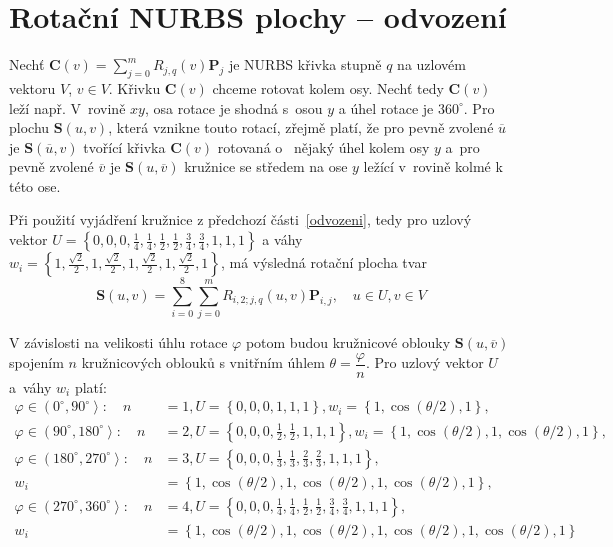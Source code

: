 \section{Rotační NURBS plochy -- odvození}\label{revSurf}

Nechť $\mathbf{C}\left(v\right)=\sum_{j=0}^{m}R_{j,q}\left(v\right)\mathbf{P}_j$ je NURBS křivka stupně $q$ na uzlovém vektoru $V$, $v\in V$. Křivku $\mathbf{C}\left(v\right)$ chceme rotovat kolem osy. Nechť tedy $\mathbf{C}\left(v\right)$ leží např. V~rovině $xy$, osa rotace je shodná s~osou $y$ a úhel rotace je $360^\circ$. Pro plochu $\mathbf{S}\left(u,v\right)$, která vznikne touto rotací, zřejmě platí, že pro pevně zvolené $\overline{u}$ je $\mathbf{S}\left(\overline{u},v\right)$ tvořící křivka $\mathbf{C}\left(v\right)$ rotovaná o~ nějaký úhel kolem osy $y$ a~pro pevně zvolené $\overline{v}$ je $\mathbf{S}\left(u,\overline{v}\right)$ kružnice se středem na ose $y$ ležící v~rovině kolmé k této ose.

Při použití vyjádření kružnice z předchozí části~\ref{odvozeni}, tedy pro uzlový vektor \linebreak$U=\left\lbrace 0,0,0,\frac{1}{4},\frac{1}{4},\frac{1}{2},\frac{1}{2},\frac{3}{4},\frac{3}{4},1,1,1 \right\rbrace$ a váhy $w_i=\left\lbrace 1,\frac{\sqrt{2}}{2},1,\frac{\sqrt{2}}{2},1,\frac{\sqrt{2}}{2},1,\frac{\sqrt{2}}{2},1\right\rbrace$, má výsledná rotační plocha tvar
\begin{equation}
\mathbf{S}\left(u,v\right)=\sum_{i=0}^{8}\sum_{j=0}^{m}R_{i,2;j,q}\left(u,v\right)\mathbf{P}_{i,j},\quad u\in U, v\in V
\end{equation}

V závislosti na velikosti úhlu rotace $\varphi$ potom budou kružnicové oblouky $\mathbf{S}\left(u,\overline{v}\right)$ spojením $n$ kružnicových oblouků s vnitřním úhlem $\theta=\dfrac{\varphi}{n}$. Pro uzlový vektor $U$ a~váhy $w_i$ platí:
\begin{align*}
	\varphi\in\left(0^\circ,90^\circ\right\rangle:\quad n&=1, U=\left\lbrace 0,0,0,1,1,1 \right\rbrace, w_i=\left\lbrace 1,\cos(\theta/2),1 \right\rbrace,\\
	\varphi\in\left(90^\circ,180^\circ\right\rangle:\quad n&=2, U=\left\lbrace 0,0,0,\frac{1}{2},\frac{1}{2},1,1,1 \right\rbrace, w_i=\left\lbrace 1,\cos(\theta/2),1,\cos(\theta/2),1 \right\rbrace,\\
	\varphi\in\left(180^\circ,270^\circ\right\rangle:\quad n&=3, U=\left\lbrace 0,0,0,\frac{1}{3},\frac{1}{3},\frac{2}{3},\frac{2}{3},1,1,1 \right\rbrace,\\
	w_i&=\left\lbrace 1,\cos(\theta/2),1,\cos(\theta/2),1,\cos(\theta/2),1 \right\rbrace,\\
	\varphi\in\left(270^\circ,360^\circ\right\rangle:\quad n&=4, U=\left\lbrace 0,0,0,\frac{1}{4},\frac{1}{4},\frac{1}{2},\frac{1}{2},\frac{3}{4},\frac{3}{4},1,1,1 \right\rbrace,\\
	w_i&=\left\lbrace 1,\cos(\theta/2),1,\cos(\theta/2),1,\cos(\theta/2),1,\cos(\theta/2),1 \right\rbrace
\end{align*}

